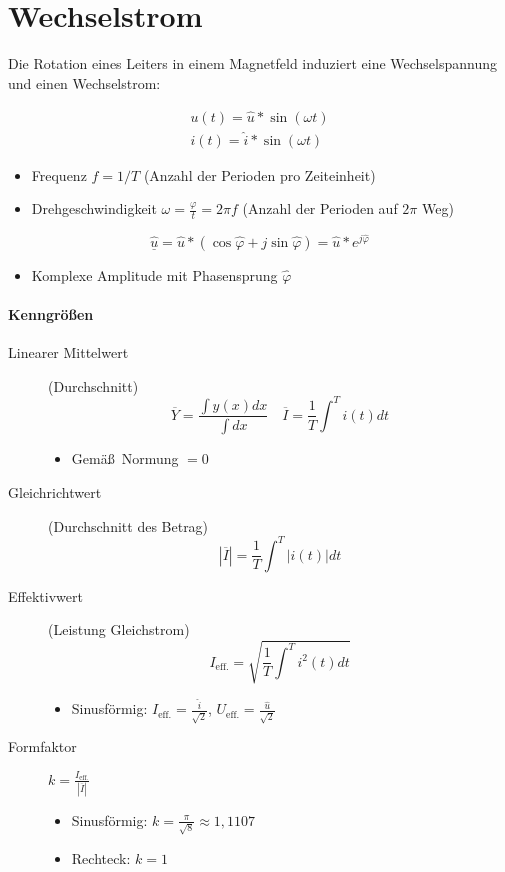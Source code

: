 \section{Wechselstrom}

Die Rotation eines Leiters in einem Magnetfeld induziert eine Wechselspannung und einen Wechselstrom:

\begin{gather*}
  u(t) = \hat{u} * \sin(\omega t) \\
  i(t) = \hat{i} * \sin(\omega t)
\end{gather*}

\begin{itemize}
  \item Frequenz $f = 1/T$ (Anzahl der Perioden pro Zeiteinheit)
  \item Drehgeschwindigkeit $\omega = \frac{\varphi}{t} = 2 \pi f$ (Anzahl der Perioden auf $2\pi$ Weg)
\end{itemize}

$$\underline{\hat{u}} = \hat{u} * (\cos \hat{\varphi} + j \sin \hat{\varphi}) = \hat{u} * e^{j\hat{\varphi}}$$

\begin{itemize}
  \item Komplexe Amplitude mit Phasensprung $\hat{\varphi}$
\end{itemize}

\paragraph{Kenngrö\ss en}

\begin{description}
  \item[Linearer Mittelwert] (Durchschnitt)
    $$\overline{Y} = \frac{\int y(x)dx}{\int dx} \quad \overline{I} = \frac{1}{T} \int^T i(t) dt$$

    \begin{itemize}
      \item Gemä\ss~Normung $= 0$
    \end{itemize}

  \item[Gleichrichtwert] (Durchschnitt des Betrag)
    $$|\overline{I}| = \frac{1}{T} \int^T |i(t)| dt$$

  \item[Effektivwert] (Leistung Gleichstrom)
    $$I_\text{eff.} = \sqrt{\frac{1}{T} \int^T i^2(t) dt} $$

    \begin{itemize}
      \item Sinusförmig: $I_\text{eff.} = \frac{\hat{i}}{\sqrt{2}}$, $U_\text{eff.} = \frac{\hat{u}}{\sqrt{2}}$
    \end{itemize}

  \item[Formfaktor] $k = \frac{I_\text{eff.}}{|\overline{I}|}$

    \begin{itemize}
      \item Sinusförmig: $k = \frac{\pi}{\sqrt{8}} \approx 1,1107$
      \item Rechteck: $k = 1$
    \end{itemize}
\end{description}

